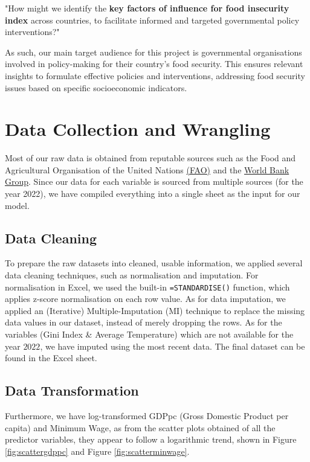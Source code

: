 \documentclass{article}
\begin{document}
\begin{formal}
    "How might we identify the \textbf{key factors of influence for food insecurity index} across countries, to facilitate informed and targeted governmental policy interventions?"
\end{formal}

\noindent As such, our main target audience for this project is governmental organisations involved in policy-making for their country's food security. This ensures relevant insights to formulate effective policies and interventions, addressing food security issues based on specific socioeconomic indicators.

\section{Data Collection and Wrangling}
Most of our raw data is obtained from reputable sources such as the Food and Agricultural Organisation of the United Nations \href{https://www.fao.org/home/en}{(FAO)} and the \href{https://data.worldbank.org}{World Bank Group}. Since our data for each variable is sourced from multiple sources (for the year 2022), we have compiled everything into a single sheet as the input for our model. 

\subsection{Data Cleaning}\label{NormalisationImputation}
To prepare the raw datasets into cleaned, usable information, we applied several data cleaning techniques, such as normalisation and imputation. For normalisation in Excel, we used the built-in \verb|=STANDARDISE()| function, which applies z-score normalisation on each row value. As for data imputation, we applied an (Iterative) Multiple-Imputation (MI) technique \cite{MeanImputation} \cite{scikit-learn} to replace the missing data values in our dataset, instead of merely dropping the rows. As for the variables (Gini Index \& Average Temperature) which are not available for the year $2022$, we have imputed using the most recent data. The final dataset can be found in the Excel sheet.

\subsection{Data Transformation}
Furthermore, we have log-transformed GDPpc (Gross Domestic Product per capita) and Minimum Wage, as from the scatter plots obtained of all the predictor variables, they appear to follow a logarithmic trend, shown in Figure \ref{fig:scattergdppc} and Figure \ref{fig:scatterminwage}.
\end{document}
